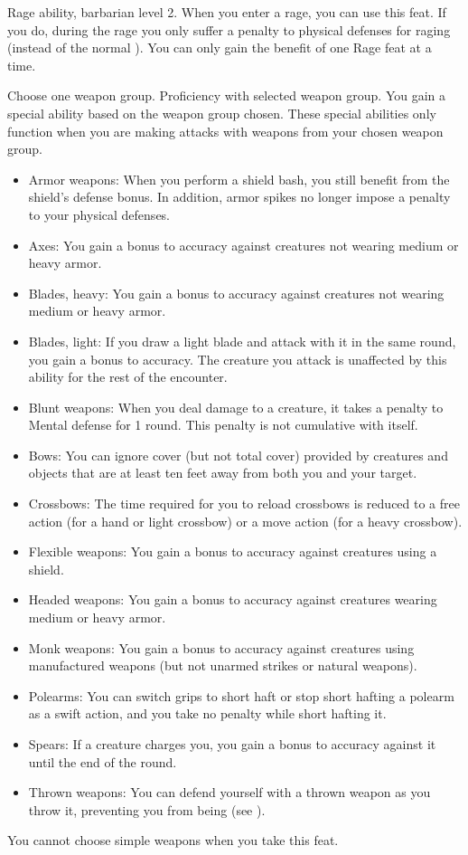 \featpre Rage ability, barbarian level 2.
\featben When you enter a rage, you can use this feat. If you do, during the rage you only suffer a  penalty to physical defenses for raging (instead of the normal ).
 You can only gain the benefit of one Rage feat at a time.

Choose one weapon group.
\featpre Proficiency with selected weapon group.
\featben You gain a special ability based on the weapon group chosen.
These special abilities only function when you are making attacks with weapons from your chosen weapon group.
\begin{itemize}
    \item Armor weapons: When you perform a shield bash, you still benefit from the shield's defense bonus.
        In addition, armor spikes no longer impose a penalty to your physical defenses.
    \item Axes: You gain a  bonus to accuracy against creatures not wearing medium or heavy armor.
    \item Blades, heavy: You gain a  bonus to accuracy against creatures not wearing medium or heavy armor.
    \item Blades, light: If you draw a light blade and attack with it in the same round, you gain a  bonus to accuracy.
        The creature you attack is unaffected by this ability for the rest of the encounter.
    \item Blunt weapons: When you deal damage to a creature, it takes a  penalty to Mental defense for 1 round.
        This penalty is not cumulative with itself.
    \item Bows: You can ignore cover (but not total cover) provided by creatures and objects that are at least ten feet away from both you and your target.
    \item Crossbows: The time required for you to reload crossbows is reduced to a free action (for a hand or light crossbow) or a move action (for a heavy crossbow).
    \item Flexible weapons: You gain a  bonus to accuracy against creatures using a shield.
    \item Headed weapons: You gain a  bonus to accuracy against creatures wearing medium or heavy armor.
    \item Monk weapons: You gain a  bonus to accuracy against creatures using manufactured weapons (but not unarmed strikes or natural weapons).
    \item Polearms: You can switch grips to short haft or stop short hafting a polearm as a swift action, and you take no penalty while short hafting it.
    \item Spears: If a creature charges you, you gain a  bonus to accuracy against it until the end of the round.
    \item Thrown weapons: You can defend yourself with a thrown weapon as you throw it, preventing you from being  (see ).
\end{itemize}
You cannot choose simple weapons when you take this feat.

